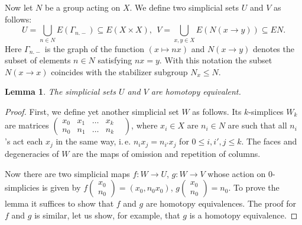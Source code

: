 \documentclass[oneside, 12pt]{amsart}
\theoremstyle{plain}
\numberwithin{equation}{section}
\newtheorem{lemma}{Lemma}
\numberwithin{lemma}{section}
\theoremstyle{remark}
\theoremstyle{definition}
\begin{document}
Now let $N$ be a group acting on $X$. We define two simplicial sets $U$ and $V$ as follows:
\[ U = \bigcup\limits_{n\in N} E(\Gamma_{n.-}) \subseteq E(X\times X),\ \ V = \bigcup\limits_{x,y\in X}E(N(x\to y)) \subseteq EN. \]
Here $\Gamma_{n.-}$ is the graph of the function $(x \mapsto nx)$ and $N(x\to y)$ denotes the subset of elements $n\in N$ satisfying $nx=y$.
With this notation the subset $N(x\to x)$ coincides with the stabilizer subgroup $N_x \leq N$.

\begin{lemma} \label{lm:quillen-a} The simplicial sets $U$ and $V$ are homotopy equivalent. \end{lemma}
\begin{proof} First, we define yet another simplicial set $W$ as follows.
Its $k$-simplices $W_k$ are matrices $\left(\begin{smallmatrix}x_0 & x_1 & \ldots & x_k&\\ n_0 & n_1 & \ldots & n_k \end{smallmatrix}\right)$,
 where $x_i\in X$ are $n_i\in N$ are such that all $n_i$'s act each $x_j$ in the same way, i.\,e. $n_ix_j = n_{i'} x_j$ for $0\leq i,i',j\leq k$. 
 The faces and degeneracies of $W$ are the maps of omission and repetition of columns.
 
 Now there are two simplicial maps $f\colon W\to U$, $g\colon W\to V$ whose action on $0$-simplicies is given by 
  $f\left(\begin{smallmatrix}x_0 \\ n_0\end{smallmatrix}\right) = (x_0, n_0x_0)$, 
  $g\left(\begin{smallmatrix}x_0 \\ n_0\end{smallmatrix}\right) = n_0$. 
 To prove the lemma it suffices to show that $f$ and $g$ are homotopy equivalences. 
 The proof for $f$ and $g$ is similar, let us show, for example, that $g$ is a homotopy equivalence.
 

\end{proof}
\end{document}
